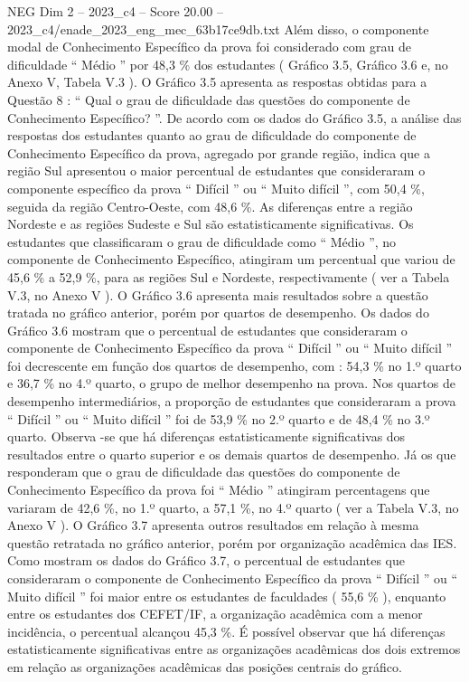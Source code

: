 \begin{textsample}{NEG Dim 2 – 2023\_c4 – Score 20.00 – 2023\_c4/enade\_2023\_eng\_mec\_63b17ce9db.txt}
Além disso, o componente modal de Conhecimento Específico da prova foi considerado com grau de dificuldade “ Médio ” por 48,3 \% dos estudantes ( Gráfico 3.5, Gráfico 3.6 e, no Anexo V, Tabela V.3 ).
O Gráfico 3.5 apresenta as respostas obtidas para a Questão 8 : “ Qual o grau de dificuldade das questões do componente de Conhecimento Específico? ”.
De acordo com os dados do Gráfico 3.5, a análise das respostas dos estudantes quanto ao grau de dificuldade do componente de Conhecimento Específico da prova, agregado por grande região, indica que a região Sul apresentou o maior percentual de estudantes que consideraram o componente específico da prova “ Difícil ” ou “ Muito difícil ”, com 50,4 \%, seguida da região Centro-Oeste, com 48,6 \%.
As diferenças entre a região Nordeste e as regiões Sudeste e Sul são estatisticamente significativas.
Os estudantes que classificaram o grau de dificuldade como “ Médio ”, no componente de Conhecimento Específico, atingiram um percentual que variou de 45,6 \% a 52,9 \%, para as regiões Sul e Nordeste, respectivamente ( ver a Tabela V.3, no Anexo V ).
O Gráfico 3.6 apresenta mais resultados sobre a questão tratada no gráfico anterior, porém por quartos de desempenho.
Os dados do Gráfico 3.6 mostram que o percentual de estudantes que consideraram o componente de Conhecimento Específico da prova “ Difícil ” ou “ Muito difícil ” foi decrescente em função dos quartos de desempenho, com : 54,3 \% no 1.º quarto e 36,7 \% no 4.º quarto, o grupo de melhor desempenho na prova.
Nos quartos de desempenho intermediários, a proporção de estudantes que consideraram a prova “ Difícil ” ou “ Muito difícil ” foi de 53,9 \% no 2.º quarto e de 48,4 \% no 3.º quarto.
Observa -se que há diferenças estatisticamente significativas dos resultados entre o quarto superior e os demais quartos de desempenho.
Já os que responderam que o grau de dificuldade das questões do componente de Conhecimento Específico da prova foi “ Médio ” atingiram percentagens que variaram de 42,6 \%, no 1.º quarto, a 57,1 \%, no 4.º quarto ( ver a Tabela V.3, no Anexo V ).
O Gráfico 3.7 apresenta outros resultados em relação à mesma questão retratada no gráfico anterior, porém por organização acadêmica das IES.
Como mostram os dados do Gráfico 3.7, o percentual de estudantes que consideraram o componente de Conhecimento Específico da prova “ Difícil ” ou “ Muito difícil ” foi maior entre os estudantes de faculdades ( 55,6 \% ), enquanto entre os estudantes dos CEFET/IF, a organização acadêmica com a menor incidência, o percentual alcançou 45,3 \%.
É possível observar que há diferenças estatisticamente significativas entre as organizações acadêmicas dos dois extremos em relação as organizações acadêmicas das posições centrais do gráfico.

\end{textsample}
